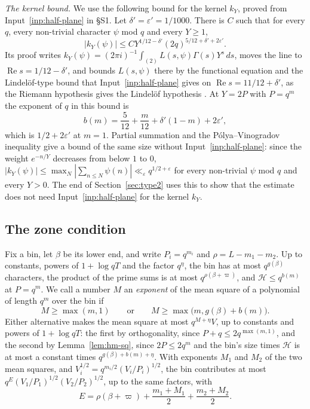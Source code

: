 \documentclass[11pt]{article}
\theoremstyle{definition}
\begin{document}
\emph{The kernel bound.} We use the following bound for the kernel $k_Y$, proved from Input~\ref{inp:half-plane} in
\S S1. Let $\delta' =
\varepsilon' = 1/1000$. There is $C$ such that for every $q$, every non-trivial character $\psi$ mod $q$ and every
$Y \ge 1$,
\[
  |k_Y(\psi)| \le C Y^{1/12 - \delta'} (2q)^{5/12 + \delta' + 2\varepsilon'}.
\]
Its proof writes $k_Y(\psi) = (2\pi i)^{-1} \int_{(2)} L(s, \psi) \Gamma(s) Y^s \, ds$, moves the line to
$\operatorname{Re} s = 1/12 - \delta'$, and bounds $L(s, \psi)$ there by the functional equation and the Lindelöf-type
bound that Input~\ref{inp:half-plane} gives on $\operatorname{Re} s = 11/12 + \delta'$, as the Riemann hypothesis gives
the Lindelöf hypothesis \cite[\S 14.2]{titchmarsh}. At $Y = 2P$ with $P = q^m$ the exponent of $q$ in this bound is
\[
  b(m) = \frac5{12} + \frac{m}{12} + \delta'(1 - m) + 2\varepsilon',
\]
which is $1/2 + 2\varepsilon'$ at $m = 1$. Partial summation and the Pólya--Vinogradov inequality
\cite[Chapter~23]{davenport} give a bound of the same size without Input~\ref{inp:half-plane}: since the weight
$e^{-n/Y}$ decreases from below $1$ to $0$, $|k_Y(\psi)| \le \max_N |\sum_{n \le N} \psi(n)| \ll_\varepsilon
q^{1/2 + \varepsilon}$ for every non-trivial $\psi$ mod $q$ and every $Y > 0$. The end of Section~\ref{sec:type2}
uses this to show that the estimate does not need Input~\ref{inp:half-plane} for the kernel $k_Y$.

\subsection{The zone condition}\label{sec:zone}

Fix a bin, let $\beta$ be its lower end, and write $P_i = q^{m_i}$ and $\rho = L - m_1 - m_2$. Up to constants,
powers of $1 + \log qT$ and the factor $q^\eta$, the bin has at most $q^{g(\beta)}$ characters, the product of the
prime sums is at most $q^{\rho(\beta + \varpi)}$, and $\mathcal H \le q^{b(m)}$ at $P = q^m$. We call a number $M$ an
\emph{exponent} of the mean square of a polynomial of length $q^m$ over the bin if
\[
  M \ge \max(m, 1) \qquad \text{or} \qquad M \ge \max\bigl(m, g(\beta) + b(m)\bigr).
\]
Either alternative makes the mean square at most $q^{M + \eta} V$, up to constants and powers of $1 + \log qT$: the
first by orthogonality, since $P + q \le 2q^{\max(m, 1)}$, and the second by Lemma~\ref{lem:hm-sq}, since $2P \le
2q^m$ and the bin's size times $\mathcal H$ is at most a constant times $q^{g(\beta) + b(m) + \eta}$. With exponents
$M_1$ and $M_2$ of the two mean squares, and $V_i^{1/2} = q^{m_i/2}(V_i/P_i)^{1/2}$, the bin contributes at most $q^E
(V_1/P_1)^{1/2}(V_2/P_2)^{1/2}$, up to the same factors, with
\[
  E = \rho(\beta + \varpi) + \frac{m_1 + M_1}2 + \frac{m_2 + M_2}2.
\]
\end{document}
